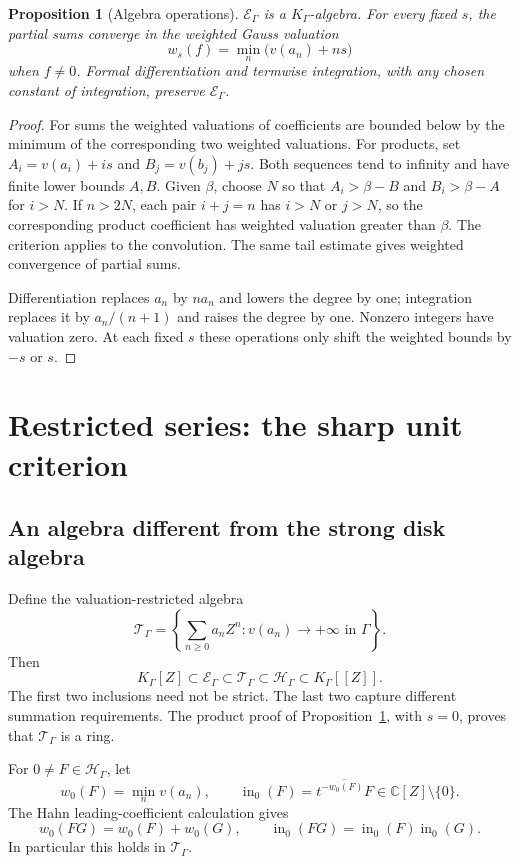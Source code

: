 \documentclass[11pt,letterpaper]{article}
\numberwithin{equation}{section}
\newtheorem{proposition}[theorem]{Proposition}
\theoremstyle{definition}
\theoremstyle{remark}
\newcommand{\C}{\mathbb C}
\newcommand{\ini}{\operatorname{in}}
\newcommand{\red}[1]{\overline{#1}}
\begin{document}
\begin{proposition}[Algebra operations]\label{prop:algebra}
$\mathcal E_\Gamma$ is a $K_\Gamma$-algebra. For every fixed $s$, the partial
sums converge in the weighted Gauss valuation
\[
 w_s(f)=\min_n\bigl(v(a_n)+ns\bigr)
\]
when $f\ne0$. Formal differentiation and termwise integration, with any
chosen constant of integration, preserve $\mathcal E_\Gamma$.
\end{proposition}
\begin{proof}
For sums the weighted valuations of coefficients are bounded below by the
minimum of the corresponding two weighted valuations. For products, set
$A_i=v(a_i)+is$ and $B_j=v(b_j)+js$. Both sequences tend to infinity and
have finite lower bounds $A,B$. Given $\beta$, choose $N$ so that
$A_i>\beta-B$ and $B_i>\beta-A$ for $i>N$. If $n>2N$, each pair $i+j=n$
has $i>N$ or $j>N$, so the corresponding product coefficient has weighted
valuation greater than $\beta$. The criterion applies to the convolution.
The same tail estimate gives weighted convergence of partial sums.

Differentiation replaces $a_n$ by $na_n$ and lowers the degree by one;
integration replaces it by $a_n/(n+1)$ and raises the degree by one.
Nonzero integers have valuation zero. At each fixed $s$ these operations only
shift the weighted bounds by $-s$ or $s$.
\end{proof}

\section{Restricted series: the sharp unit criterion}\label{sec:units}

\subsection{An algebra different from the strong disk algebra}
Define the valuation-restricted algebra
\begin{equation}\label{eq:T}
 \mathcal T_\Gamma
 =\left\{\sum_{n\ge0}a_nZ^n:v(a_n)\to+\infty\text{ in }\Gamma\right\}.
\end{equation}
Then
\[
 K_\Gamma[Z]\subset\mathcal E_\Gamma\subset\mathcal T_\Gamma
 \subset\mathcal H_\Gamma\subset K_\Gamma[[Z]].
\]
The first two inclusions need not be strict. The last two capture different
summation requirements. The product proof of Proposition~\ref{prop:algebra},
with $s=0$, proves that $\mathcal T_\Gamma$ is a ring.

For $0\ne F\in\mathcal H_\Gamma$, let
\[
 w_0(F)=\min_n v(a_n),\qquad
 \ini_0(F)=\red{t^{-w_0(F)}F}\in\C[Z]\setminus\{0\}.
\]
The Hahn leading-coefficient calculation gives
\begin{equation}\label{eq:gauss-multiplicative}
 w_0(FG)=w_0(F)+w_0(G),\qquad
 \ini_0(FG)=\ini_0(F)\ini_0(G).
\end{equation}
In particular this holds in $\mathcal T_\Gamma$.
\end{document}
